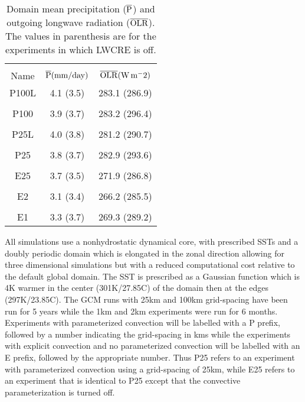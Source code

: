 \documentclass[11pt]{article}   	%
\begin{document}
\begin{table}
\begin{center}
\caption{Domain mean precipitation ($\overline{\rm{P}}$) and outgoing longwave radiation 
($\overline{\rm{OLR}}$).
The values in parenthesis are for the experiments in which LWCRE is off.}
    \begin{tabular}{*{3}{c}}
    \hline
    \hline
    \\
 Name &   $\overline{\rm{P}} (\mathrm{mm/day})$ & $\overline{\rm{OLR}} (\rm{W \, m^-2})$   \\ \hline
  P100L   &  4.1 (3.5)   &  283.1 (286.9)          \\ 
    \\
  P100 &   3.9 (3.7)   &  283.2 (296.4)             \\  
    \\
  P25L &   4.0 (3.8)  &  281.2 (290.7)             \\  
    \\
  P25  &   3.8 (3.7)    & 282.9 (293.6)             \\  
    \\
 E25  & 3.7 (3.5)    &   271.9 (286.8)               \\  
    \\
 E2   &  3.1 (3.4)   &  266.2 (285.5)               \\ 
    \\
 E1   &  3.3 (3.7)   &  269.3 (289.2)               \\  \hline

    \end{tabular}\par
    \label{tab:lambda}
\end{center}
\end{table}

All simulations use a nonhydrostatic dynamical core, with prescribed SSTs and a doubly periodic domain which is elongated in the zonal 
direction allowing for three dimensional simulations but with a reduced computational cost relative to the default global domain.  The SST is prescribed as a Gaussian function which is 4K warmer in the center (301K/27.85C) of the domain then 
at the edges (297K/23.85C).  The GCM runs with 25km and 100km grid-spacing have been run for 5 years while the 
1km and 2km experiments were run for 6 months.  Experiments with parameterized convection will be labelled with a P prefix, followed
by a number indicating the grid-spacing in kms while the experiments with explicit convection and no parameterized convection will be 
labelled with an E prefix, followed by the appropriate number.  Thus P25 refers to an experiment with parameterized convection using a 
grid-spacing of 25km, while E25 refers to an experiment that is identical to P25 except that the convective parameterization is turned off.    
\end{document}
